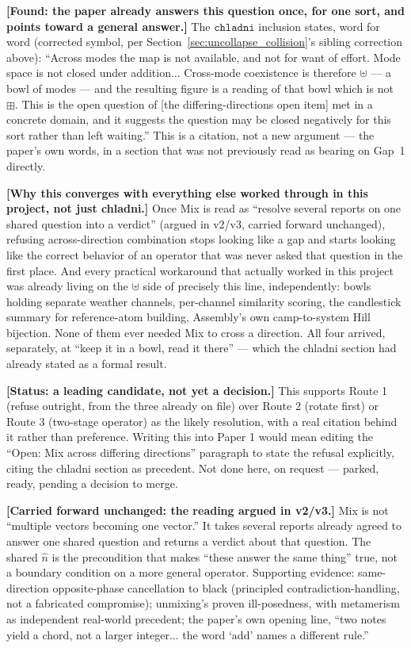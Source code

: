 \documentclass[11pt]{article}
\begin{document}
\textbf{[Found: the paper already answers this question once, for one
sort, and points toward a general answer.]} The $\mathtt{chladni}$
inclusion states, word for word (corrected symbol, per
Section~\ref{sec:uncollapse_collision}'s sibling correction above):
``Across modes the map is not available, and not for want of effort.
Mode space is not closed under addition... Cross-mode coexistence is
therefore $\uplus$ --- a bowl of modes --- and the resulting figure is
a reading of that bowl which is not $\boxplus$. This is the open
question of [the differing-directions open item] met in a concrete
domain, and it suggests the question may be closed negatively for this
sort rather than left waiting.'' This is a citation, not a new
argument --- the paper's own words, in a section that was not
previously read as bearing on Gap~1 directly.

\textbf{[Why this converges with everything else worked through in
this project, not just chladni.]} Once Mix is read as ``resolve
several reports on one shared question into a verdict'' (argued in
v2/v3, carried forward unchanged), refusing across-direction
combination stops looking like a gap and starts looking like the
correct behavior of an operator that was never asked that question in
the first place. And every practical workaround that actually worked
in this project was already living on the $\uplus$ side of precisely
this line, independently: bowls holding separate weather channels,
per-channel similarity scoring, the candlestick summary for
reference-atom building, Assembly's own camp-to-system Hill bijection.
None of them ever needed Mix to cross a direction. All four arrived,
separately, at ``keep it in a bowl, read it there'' --- which the
chladni section had already stated as a formal result.

\textbf{[Status: a leading candidate, not yet a decision.]} This
supports Route 1 (refuse outright, from the three already on file)
over Route 2 (rotate first) or Route 3 (two-stage operator) as the
likely resolution, with a real citation behind it rather than
preference. Writing this into Paper 1 would mean editing the
``Open: Mix across differing directions'' paragraph to state the
refusal explicitly, citing the chladni section as precedent. Not done
here, on request --- parked, ready, pending a decision to merge.

\textbf{[Carried forward unchanged: the reading argued in v2/v3.]} Mix
is not ``multiple vectors becoming one vector.'' It takes several
reports already agreed to answer one shared question and returns a
verdict about that question. The shared $\hat n$ is the precondition
that makes ``these answer the same thing'' true, not a boundary
condition on a more general operator. Supporting evidence: same-
direction opposite-phase cancellation to black (principled
contradiction-handling, not a fabricated compromise); unmixing's
proven ill-posedness, with metamerism as independent real-world
precedent; the paper's own opening line, ``two notes yield a chord,
not a larger integer... the word `add' names a different rule.''
\end{document}
